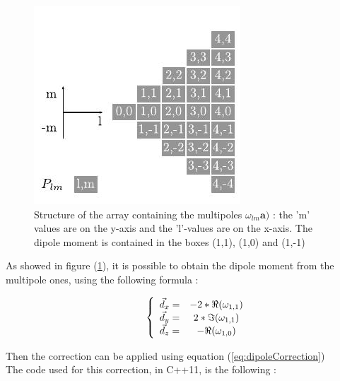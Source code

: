 \documentclass[12pt,twoside,a4paper]{report}
\begin{document}
	\begin{figure}[H]
	\label{fig:triArray} 
	\includegraphics[scale=1]{triArray}
    \centering 
    \caption{Structure of the array containing the multipoles $\omega_{lm}\textbf{a})$ : the 'm' values are on the y-axis and the 'l'-values are on the x-axis. The dipole moment is contained in the boxes (1,1), (1,0) and (1,-1) }
   \label{fig:triArray}     
   \end{figure} 

As showed in figure (\ref{fig:triArray}), it is possible to obtain the dipole moment from the multipole ones, using the following formula :




\begin{equation}
\hspace{10 mm}
\left\lbrace
\begin{array}{ccc}
\vec{d}_x = & -2 * \Re(\omega_{1,1})\\
\vec{d}_y = &  2 * \Im(\omega_{1,1})\\
\vec{d}_z = & -\Re(\omega_{1,0})
\end{array}\right.
\end{equation}

Then the correction can be applied using equation (\ref{eq:dipoleCorrection})\\


The code used for this correction, in C++11, is the following :
	
\end{document}

